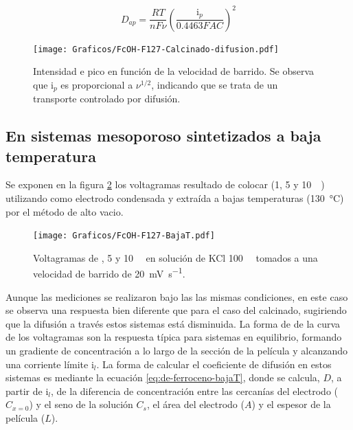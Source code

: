 		 \begin{equation}
					D_{ap}=\frac{RT}{nF\nu}\left(\frac{\text{i}_p}{0.4463FAC}\right)^2
					\label{eq:dapp_bajaT}
			\end{equation}  
	 

		    \begin{figure}[ht]
				\centering
		 	    \texttt{[image: Graficos/FcOH-F127-Calcinado-difusion.pdf]}
		        \caption[i$_p$ en función de $\nu$ para \fc\space]{Intensidad e pico en función de la velocidad de barrido. Se observa que $\text{i}_p$ es proporcional a $\nu ^{1/2}$, indicando que se trata de un transporte controlado por difusión.}
		        \label{fig:difusion_calcinado}
		      	\end{figure}
	      	
	\subsection{En sistemas mesoporoso sintetizados a baja temperatura}

		Se exponen en la figura \ref{fig:fcoh_bajaT} los voltagramas resultado de colocar \fc\space (1, 5 y \SI{10}{\milli\Molar}) utilizando como electrodo \pdmF\space condensada y extraída a bajas temperaturas (\SI{130}{\celsius}) por el método de alto vacio. 
			\begin{figure}[ht]
				\centering
		 	    \texttt{[image: Graficos/FcOH-F127-BajaT.pdf]}
		        \caption[Voltagrama para \fc\space en \pdm\space de baja temperatura]{Voltagramas de \fc{}, 5 y \SI{10}{\milli\Molar} en solución de KCl \SI{100}{\milli\Molar} tomados a una velocidad de barrido de \SI{20}{\milli\volt\per\second}.}
		        \label{fig:fcoh_bajaT}
		      	\end{figure}
		
		Aunque las mediciones se realizaron bajo las las mismas condiciones, en este caso se observa una respuesta bien diferente que para el caso del calcinado, sugiriendo que la difusión a través estos sistemas está disminuida. La forma de de la curva de los voltagramas son la respuesta típica para sistemas en equilibrio, formando un gradiente de concentración a lo largo de la sección de la película y alcanzando una corriente límite $\text{i}_l$. 
		La forma de calcular el coeficiente de difusión en estos sistemas es mediante la ecuación \ref{eq:de-ferroceno-bajaT}, donde se calcula, $D$, a partir de $\text{i}_l$, de la diferencia de concentración entre las cercanías del electrodo ($C_{x=0}$) y el seno de la solución $C_s$, el área del electrodo ($A$) y el espesor de la película ($L$).

